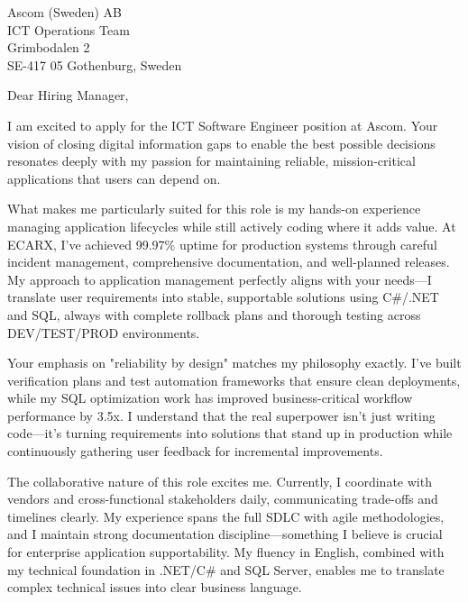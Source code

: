 \documentclass[a4paper,10pt]{article}
\begin{document}
\pagestyle{empty} %

\begin{letter}{\color{darkblue}
Ascom (Sweden) AB\\
ICT Operations Team\\
Grimbodalen 2\\
SE-417 05 Gothenburg, Sweden}

\vspace{30pt}

\opening{Dear Hiring Manager,}

\vspace{8pt}

I am excited to apply for the ICT Software Engineer position at Ascom. Your vision of closing digital information gaps to enable the best possible decisions resonates deeply with my passion for maintaining reliable, mission-critical applications that users can depend on.

What makes me particularly suited for this role is my hands-on experience managing application lifecycles while still actively coding where it adds value. At ECARX, I've achieved 99.97\% uptime for production systems through careful incident management, comprehensive documentation, and well-planned releases. My approach to application management perfectly aligns with your needs—I translate user requirements into stable, supportable solutions using C\#/.NET and SQL, always with complete rollback plans and thorough testing across DEV/TEST/PROD environments.

Your emphasis on "reliability by design" matches my philosophy exactly. I've built verification plans and test automation frameworks that ensure clean deployments, while my SQL optimization work has improved business-critical workflow performance by 3.5x. I understand that the real superpower isn't just writing code—it's turning requirements into solutions that stand up in production while continuously gathering user feedback for incremental improvements.

The collaborative nature of this role excites me. Currently, I coordinate with vendors and cross-functional stakeholders daily, communicating trade-offs and timelines clearly. My experience spans the full SDLC with agile methodologies, and I maintain strong documentation discipline—something I believe is crucial for enterprise application supportability. My fluency in English, combined with my technical foundation in .NET/C\# and SQL Server, enables me to translate complex technical issues into clear business language.


\end{letter}
\end{document}
